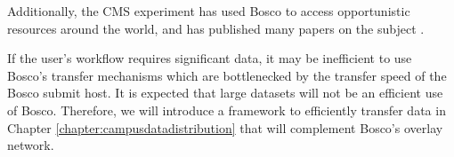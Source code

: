 Additionally, the CMS experiment has used Bosco to access opportunistic resources around the world, and has published many papers on the subject \cite{hufnagelcmsopportunistic, piperovoperationalchep15, wagner2013using, kreuzer2014opportunistic}.

If the user's workflow requires significant data, it may be inefficient to use Bosco's transfer mechanisms which are bottlenecked by the transfer speed of the Bosco submit host.  It is expected that large datasets will not be an efficient use of Bosco.  Therefore, we will introduce a framework to efficiently transfer data in Chapter \ref{chapter:campusdatadistribution} that will complement Bosco's overlay network.



